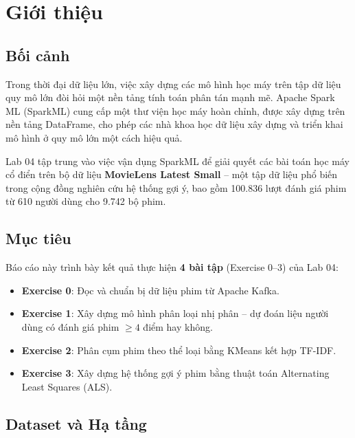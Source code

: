 \section{Giới thiệu}

\subsection{Bối cảnh}

Trong thời đại dữ liệu lớn, việc xây dựng các mô hình học máy trên tập dữ liệu quy mô lớn đòi hỏi một nền tảng tính toán phân tán mạnh mẽ. Apache Spark ML (SparkML) cung cấp một thư viện học máy hoàn chỉnh, được xây dựng trên nền tảng DataFrame, cho phép các nhà khoa học dữ liệu xây dựng và triển khai mô hình ở quy mô lớn một cách hiệu quả.

Lab 04 tập trung vào việc vận dụng SparkML để giải quyết các bài toán học máy cổ điển trên bộ dữ liệu \textbf{MovieLens Latest Small} -- một tập dữ liệu phổ biến trong cộng đồng nghiên cứu hệ thống gợi ý, bao gồm 100.836 lượt đánh giá phim từ 610 người dùng cho 9.742 bộ phim.

\subsection{Mục tiêu}

Báo cáo này trình bày kết quả thực hiện \textbf{4 bài tập} (Exercise 0--3) của Lab 04:

\begin{itemize}
    \item \textbf{Exercise 0}: Đọc và chuẩn bị dữ liệu phim từ Apache Kafka.
    \item \textbf{Exercise 1}: Xây dựng mô hình phân loại nhị phân -- dự đoán liệu người dùng có đánh giá phim $\geq 4$ điểm hay không.
    \item \textbf{Exercise 2}: Phân cụm phim theo thể loại bằng KMeans kết hợp TF-IDF.
    \item \textbf{Exercise 3}: Xây dựng hệ thống gợi ý phim bằng thuật toán Alternating Least Squares (ALS).
\end{itemize}

\subsection{Dataset và Hạ tầng}

